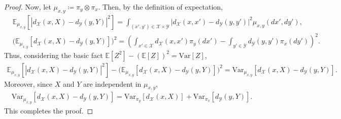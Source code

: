 \documentclass{article}
\theoremstyle{plain}
\theoremstyle{definition}
\theoremstyle{remark}
\begin{document}
\begin{proof}
	Now, let $\mu_{x,y} \coloneqq \pi_y \otimes \pi_x$. Then, by the definition of expectation, 
	\begin{align*}
		&\mathbb{E}_{\mu_{x,y}}\left[ | d_{\mathcal{X}}(x,X) - d_{\mathcal{Y}}(y,Y) |^2\right] = \int_{(x',y') \in \mathcal{X}\times\mathcal{Y}} \big|d_{\mathcal{X}}(x,x') - d_{\mathcal{Y}}(y,y')\big|^2 \mu_{x,y}(dx',dy') ,\\
		&\Big(\mathbb{E}_{\mu_{x,y}}\left[d_{\mathcal{X}}(x,X) - d_{\mathcal{Y}}(y,Y)\right]\Big)^2 = \left(\int_{x' \in \mathcal{X}}d_{\mathcal{X}}(x,x') \pi_y(dx') - \int_{y' \in \mathcal{Y}}d_{\mathcal{Y}}(y,y')\pi_x(dy')\right)^2 .
	\end{align*}
	Thus, considering the basic fact $\mathbb{E}[Z^2] - (\mathbb{E}[Z])^2 = \mathrm{Var}[Z]$,
	\begin{align*}
		\mathbb{E}_{\mu_{x,y}}\left[ | d_{\mathcal{X}}(x,X) - d_{\mathcal{Y}}(y,Y) |^2\right] - \Big(\mathbb{E}_{\mu_{x,y}}\left[d_{\mathcal{X}}(x,X) - d_{\mathcal{Y}}(y,Y)\right]\Big)^2 = \mathrm{Var}_{\mu_{x,y}}[d_{\mathcal{X}}(x,X) - d_{\mathcal{Y}}(y,Y)] .
	\end{align*}
	Moreover, since $X$ and $Y$ are independent in $\mu_{x,y}$,
	\begin{align*}
		\mathrm{Var}_{\mu_{x,y}}[d_{\mathcal{X}}(x,X) - d_{\mathcal{Y}}(y,Y)] = \mathrm{Var}_{\pi_y}[d_{\mathcal{X}}(x,X)] + \mathrm{Var}_{\pi_{x}}[d_{\mathcal{Y}}(y,Y)] .
	\end{align*}
	This completes the proof.
\end{proof}
\end{document}
